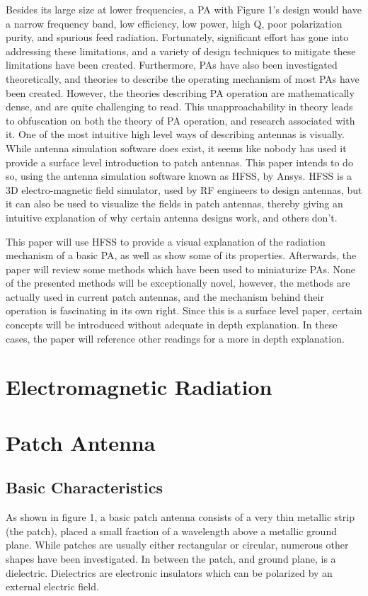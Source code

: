 \documentclass[12pt]{article}
\begin{document}
Besides its large size at lower frequencies, a PA with Figure 1's design would have a narrow frequency band, low efficiency, low power, high Q, poor polarization purity, and spurious feed radiation\cite{balanis2016antenna}. Fortunately, significant effort has gone into addressing these limitations, and a variety of design techniques to mitigate these limitations have been created\cite{balanis2016antenna}. Furthermore, PAs have also been investigated theoretically, and theories to describe the operating mechanism of most PAs have been created. However, the theories describing PA operation are mathematically dense, and are quite challenging to read. This unapproachability in theory leads to obfuscation on both the theory of PA operation, and research associated with it. One of the most intuitive high level ways of describing antennas is visually. While antenna simulation software does exist, it seems like nobody has used it provide a surface level introduction to patch antennas. This paper intends to do so, using the antenna simulation software known as HFSS, by Ansys. HFSS is a 3D electro-magnetic field simulator, used by RF engineers to design antennas, but it can also be used to visualize the fields in patch antennas, thereby giving an intuitive explanation of why certain antenna designs work, and others don't.

This paper will use HFSS to provide a visual explanation of the radiation mechanism of a basic PA, as well as show some of its properties. Afterwards, the paper will review some methods which have been used to miniaturize PAs. None of the presented methods will be exceptionally novel, however, the methods are actually used in current patch antennas, and the mechanism behind their operation is fascinating in its own right. Since this is a surface level paper, certain concepts will be introduced without adequate in depth explanation. In these cases, the paper will reference other readings for a more in depth explanation.            
  
\section{Electromagnetic Radiation}  
  
\section{Patch Antenna}

\subsection{Basic Characteristics}
As shown in figure 1, a basic patch antenna consists of a very thin metallic strip (the patch), placed a small fraction of a wavelength above a metallic ground plane. While patches are usually either rectangular or circular\cite{khan2015microstrip}, numerous other shapes have been investigated\cite{balanis2016antenna}. In between the patch, and ground plane, is a dielectric. Dielectrics are electronic insulators which can be polarized by an external electric field. 
\end{document}
